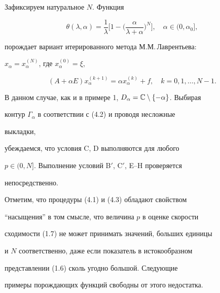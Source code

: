 \begin{exam}


Зафиксируем натуральное $N$. Функция


$$


\theta(\lambda,\alpha)=\frac{1}{\lambda}\bigg[1-


\bigg(\frac{\alpha}{\lambda+\alpha} \bigg)^N\bigg],\quad


\alpha\in(0,\alpha_0],


$$


порождает вариант итерированного метода М.М.\,Лаврентьева:


$x_\alpha=x^{(N)}_\alpha$, где $x^{(0)}_\alpha=\xi$,


\begin{equation}


(A+\alpha E)x^{(k+1)}_\alpha=\alpha x^{(k)}_\alpha+f,\quad


k=0,1,\dotsc,N-1.


\end{equation}


В данном случае, как и в примере 1, $D_\alpha=\Bbb 


C\setminus\{-\alpha\}$. Выбирая 


контур $\Gamma_\alpha$ в соответствии с (4.2) и проводя несложные 


выкладки, 


убеждаемся, что условия C, D выполняются для любого 


$p\in(0,N]$. Выполнение условий B$'$, C$'$, E--H проверяется 


непосредственно.


\end{exam}





Отметим, что процедуры (4.1) и (4.3) обладают свойством 


``насыщения'' в том смысле, что величина $p$ в оценке скорости 


сходимости (1.7) не может принимать значений, больших единицы 


и $N$ соответственно, даже если показатель в истокообразном 


представлении (1.6) сколь угодно большой. Следующие 


примеры порождающих функций свободны от этого недостатка.





